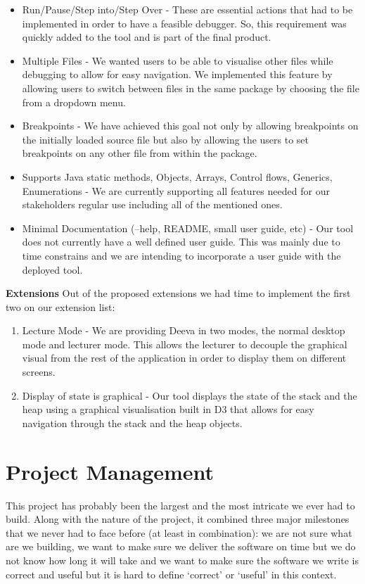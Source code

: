 \documentclass[11pt, a4paper]{article}
\begin{document}
\begin{itemize}
\item Run/Pause/Step into/Step Over - These are essential actions that had to be implemented in order to have a feasible debugger. So, this requirement was quickly added to the tool and is part of the final product.
\item Multiple Files - We wanted users to be able to visualise other files while debugging to allow for easy navigation. We implemented this feature by allowing users to switch between files in the same package by choosing the file from a dropdown menu.
\item Breakpoints - We have achieved this goal not only by allowing breakpoints on the initially loaded source file but also by allowing the users to set breakpoints on any other file from within the package.
\item Supports Java static methods, Objects, Arrays, Control flows, Generics, Enumerations - We are currently supporting all features needed for our stakeholders regular use including all of the mentioned ones.
\item Minimal Documentation (--help, README, small user guide, etc) - Our tool does not currently have a well defined user guide. This was mainly due to time constrains and we are intending to incorporate a user guide with the deployed tool.
\end{itemize}

\textbf{Extensions}
Out of the proposed extensions we had time to implement the first two on our extension list:
\begin{enumerate}
\item Lecture Mode - We are providing Deeva in two modes, the normal desktop mode and lecturer mode. This allows the lecturer to decouple the graphical visual from the rest of the application in order to display them on different screens.
\item Display of state is graphical - Our tool displays the state of the stack and the heap using a graphical visualisation built in D3 that allows for easy navigation through the stack and the heap objects.
\end{enumerate}

\section{Project Management}
This project has probably been the largest and the most intricate we ever had to build.
Along with the nature of the project, it combined three major milestones that we never had to face before (at least in combination): we are not sure what are we building, we want to make sure we deliver the software on time but we do not know how long it will take and we want to make sure the software we write is correct and useful but it is hard to define `correct' or `useful' in this context.
\end{document}
